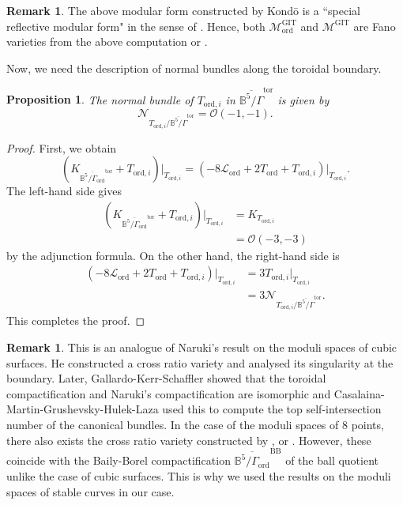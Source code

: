 \documentclass[12pt, pdftex]{amsart}
\theoremstyle{plain}
\newtheorem{prop}[thm]{Proposition}
\theoremstyle{definition}
\newtheorem{rem}[thm]{Remark}
\numberwithin{equation}{section}
\def\B{{\mathbb B}}
\def\ord{\mathrm{ord}}
\def\GIT{\mathrm{GIT}}
\def\tor{\mathrm{tor}}
\def\BB{\mathrm{BB}}
\def\L{\mathscr{L}}
\def\M{\mathcal{M}}
\def\OO{\mathscr{O}}
\begin{document}
\begin{rem}
The above modular form constructed by Kond\={o} is a ``special reflective modular form" in the sense of \cite[Assumption 2.1]{MO22}.
Hence, both $\M_{\ord}^{\GIT}$ and $\M^{\GIT}$ are Fano varieties from the above computation or \cite[Theorem 2.4]{MO22}.
\end{rem}


Now, we need the description of normal bundles along the toroidal  boundary.
\begin{prop}
\label{prop:normal_bundles}
The normal bundle of $T_{\ord, i}$ in $\overline{\B^5/\Gamma}^{\tor}$ is given by
\[\mathcal{N}_{T_{\ord, i}/\overline{\B^5/\Gamma}^{\tor}}=\OO(-1,-1).\]
\end{prop}
\begin{proof}
First, we obtain
\[(K_{\overline{\B^5/\Gamma_{\ord}}^{\tor}}+T_{\ord,i})\vert_{T_{\ord,i}}=(-8\L_{\ord}+2T_{\ord}+T_{\ord,i})\vert_{T_{\ord,i}}.\]
The left-hand side gives
\begin{align*}
    (K_{\overline{\B^5/\Gamma_{\ord}}^{\tor}}+T_{\ord,i})\vert_{T_{\ord,i}}&=K_{T_{\ord,i}}\\
    &=\OO(-3,-3)
\end{align*}
by the adjunction formula.
On the other hand, the right-hand side is
\begin{align*}
    (-8\L_{\ord}+2T_{\ord}+T_{\ord,i})\vert_{T_{\ord,i}}
    &= 3T_{\ord,i}\vert_{T_{\ord,i}}\\
    &=3\mathcal{N}_{T_{\ord, i}/\overline{\B^5/\Gamma}^{\tor}}.
\end{align*}
This completes the proof.

\end{proof}

\begin{rem}
\label{rem:cross_ratio}
This is an analogue of Naruki's result \cite[Proposition 12.1]{Na82} on the moduli spaces of cubic surfaces.
He constructed a cross ratio variety and analysed its singularity at the boundary.
Later, Gallardo-Kerr-Schaffler \cite[Theorem 1.4]{GKS21} showed that the toroidal compactification and Naruki's compactification are isomorphic and Casalaina-Martin-Grushevsky-Hulek-Laza \cite[Theorem 1.2]{CMGHL22} used this to compute the top self-intersection number of the canonical bundles.
In the case of the moduli spaces of 8 points, there also exists the cross ratio variety constructed by \cite[Theorem 2.4]{FM11}, \cite[Theorem 7.2]{Ko07a} or \cite[Theorem 1.1]{MT04}.
However, these coincide with the Baily-Borel compactification $\overline{\B^5/\Gamma_{\ord}}^{\BB}$ of the ball quotient unlike the case of cubic surfaces.
This is why we used the results on the moduli spaces of stable curves in our case.
\end{rem}
\end{document}
